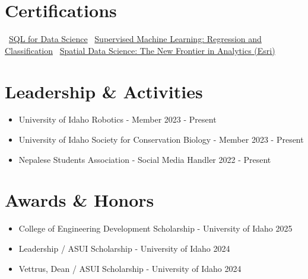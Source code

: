 \documentclass[10pt]{article}
\begin{document}
\vspace{-10pt}

\section*{Certifications}
\noindent
\textbullet\ \href{https://courses.edx.org/certificates/742e2f851cef479b87f91cfe877c6fce}{SQL for Data Science}
\quad
\textbullet\ \href{https://www.coursera.org/account/accomplishments/verify/VDULR30U389G}{Supervised Machine Learning: Regression and Classification}
\quad
\textbullet\ \href{https://www.esri.com/training/TrainingRecord/Certificate/raun9583_ui_uidaho/66ce66def444ed00bf0a33f9/420}{Spatial Data Science: The New Frontier in Analytics (Esri)}




\vspace{-10pt}

\section*{Leadership \& Activities}
\begin{itemize}[leftmargin=*, labelsep=0.5em, itemsep=2pt]
    \item University of Idaho Robotics - Member \hfill 2023 - Present
    \item University of Idaho Society for Conservation Biology - Member \hfill 2023 - Present
    \item Nepalese Students Association - Social Media Handler \hfill 2022 - Present
\end{itemize}

\vspace{-10pt}

\section*{Awards \& Honors}
\begin{itemize}[leftmargin=*, labelsep=0.5em, itemsep=2pt]
    \item College of Engineering Development Scholarship - University of Idaho \hfill 2025
    \item Leadership / ASUI Scholarship - University of Idaho \hfill 2024
    \item Vettrus, Dean / ASUI Scholarship - University of Idaho \hfill 2024
\end{itemize}
\end{document}
